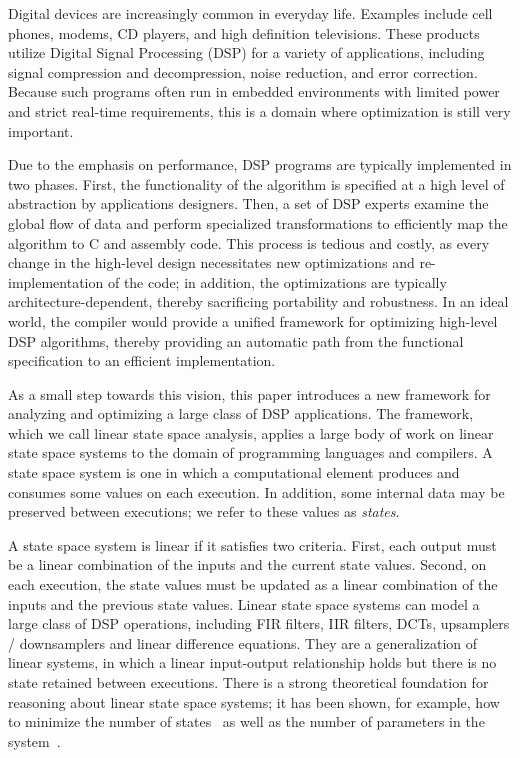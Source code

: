 

Digital devices are increasingly common in everyday life. Examples
include cell phones, modems, CD players, and high definition
televisions. These products utilize Digital Signal Processing (DSP)
for a variety of applications, including signal compression and
decompression, noise reduction, and error correction.  Because such
programs often run in embedded environments with limited power and
strict real-time requirements, this is a domain where optimization is
still very important.  

Due to the emphasis on performance, DSP programs are typically
implemented in two phases.  First, the functionality of the algorithm
is specified at a high level of abstraction by applications designers.
Then, a set of DSP experts examine the global flow of data and perform
specialized transformations to efficiently map the algorithm to C and
assembly code.  This process is tedious and costly, as every change in
the high-level design necessitates new optimizations and
re-implementation of the code; in addition, the optimizations are
typically architecture-dependent, thereby sacrificing portability and
robustness.  In an ideal world, the compiler would provide a unified
framework for optimizing high-level DSP algorithms, thereby providing
an automatic path from the functional specification to an efficient
implementation.

As a small step towards this vision, this paper introduces a new
framework for analyzing and optimizing a large class of DSP
applications.  The framework, which we call linear state space
analysis, applies a large body of work on linear state space systems
to the domain of programming languages and compilers.  A state space
system is one in which a computational element produces and consumes
some values on each execution.  In addition, some internal data may be
preserved between executions; we refer to these values as {\it
states}.

A state space system is linear if it satisfies two criteria.  First,
each output must be a linear combination of the inputs and the current
state values.  Second, on each execution, the state values must be
updated as a linear combination of the inputs and the previous state
values.  Linear state space systems can model a large class of DSP
operations, including FIR filters, IIR filters, DCTs, upsamplers /
downsamplers and linear difference equations.  They are a
generalization of linear systems, in which a linear input-output
relationship holds but there is no state retained between executions.
There is a strong theoretical foundation for reasoning about linear
state space systems; it has been shown, for example, how to minimize
the number of states~\cite{Moore} as well as the number of parameters
in the system~\cite{Ackermann/Bucy,Mayne,Schutter}.

